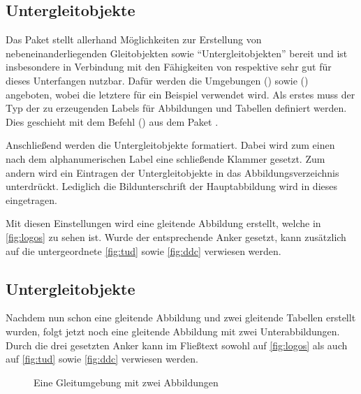 \documentclass[%
  english,ngerman,%
  cdgeometry=no,DIV=12,%
  cd=false,cdfont=false,cdtitle=true,%
  headings=normal,%
  automark,%
  listof=toc,%
]{tudscrartcl}
\begin{document}
\subsection{Untergleitobjekte}
\label{sec:subfloats}%
%
Das Paket  stellt allerhand Möglichkeiten zur Erstellung von 
nebeneinanderliegenden Gleitobjekten sowie \enquote{Untergleitobjekten} bereit 
und ist insbesondere in Verbindung mit den Fähigkeiten von  
respektive  sehr gut für dieses Unterfangen nutzbar. Dafür 
werden die Umgebungen () sowie 
() angeboten, wobei die letztere für 
ein Beispiel verwendet wird. Als erstes muss der Typ der zu erzeugenden Labels 
für Abbildungen und Tabellen definiert werden. Dies geschieht mit dem Befehl 
() aus dem Paket 
.
%
\begin{Preamble}
\end{Preamble}
%
Anschließend werden die Untergleitobjekte formatiert. Dabei wird zum einen nach 
dem alphanumerischen Label eine schließende Klammer gesetzt. Zum andern wird 
ein Eintragen der Untergleitobjekte in das Abbildungsverzeichnis unterdrückt. 
Lediglich die Bildunterschrift der Hauptabbildung wird in dieses eingetragen.
%
\begin{Preamble*}
\captionsetup[subfloat]{labelformat=brace,list=off}

\end{Preamble*}
%
Mit diesen Einstellungen wird eine gleitende Abbildung erstellt, welche in 
\autoref{fig:logos} zu sehen ist. Wurde der entsprechende Anker gesetzt, kann 
zusätzlich auf die untergeordnete \autoref{fig:tud} sowie \autoref{fig:ddc} 
verwiesen werden.
%
\begin{Trunk+}
\subsection{Untergleitobjekte}
Nachdem nun schon eine gleitende Abbildung und zwei gleitende Tabellen 
erstellt wurden, folgt jetzt noch eine gleitende Abbildung mit zwei 
Unterabbildungen. Durch die drei gesetzten Anker kann im Fließtext 
sowohl auf \autoref{fig:logos} als auch auf \autoref{fig:tud} sowie 
\autoref{fig:ddc} verwiesen werden.

\end{Trunk+}
\begin{Trunk}
\begin{figure}
%
  {\caption{Eine Gleitumgebung mit zwei Abbildungen}\label{fig:logos}}%
\end{figure}

\end{Trunk}
\InputCode
\end{document}
